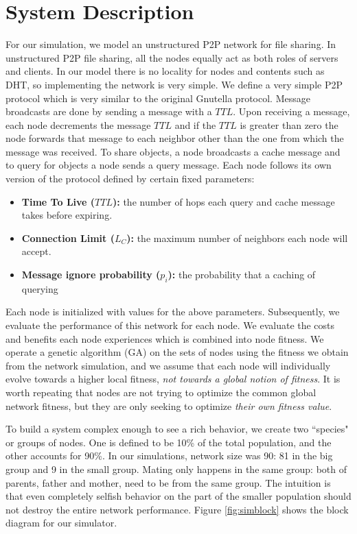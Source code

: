 \documentclass[12pt,journal,draftcls,letterpaper,onecolumn]{IEEEtran}
\begin{document}
\section{System Description}\label{sec:system}

For our simulation, we model an unstructured P2P network for file
sharing\cite{journals/comsur/LuaCPSL05}. In unstructured P2P file sharing, all the nodes
equally act as both roles of servers and clients.  In our model there is no
locality for nodes and contents such as DHT, so implementing the network is
very simple.  We define a very simple P2P protocol which is very similar to
the original Gnutella protocol.  Message broadcasts are done by sending a
message with a $TTL$.  Upon receiving a message, each node decrements the
message $TTL$ and if the $TTL$ is greater than zero the node forwards that message
to each neighbor other than the one from which the message was received.  To
share objects, a node broadcasts a cache message and to query for objects a
node sends a query message.  Each node follows its own version of the protocol
defined by certain fixed parameters:

\begin{itemize}
\item {\bf Time To Live ($TTL$):} the number of hops each query and cache message takes
before expiring.
\item {\bf Connection Limit ($L_C$):}
the maximum number of neighbors each node will accept.
\item {\bf Message ignore probability ($p_i$):}
the probability that a caching of querying 
\end{itemize}

Each node is initialized with values for the above parameters.  Subsequently,
we evaluate the performance of this network for each node.  We evaluate the
costs and benefits each node experiences which is combined into node fitness.
We operate a genetic algorithm (GA)\cite{genetic} on the sets of nodes using
the fitness we obtain from the network simulation, and we assume that each
node will individually evolve towards a higher local fitness, \emph{not
towards a global notion of fitness}.  It is worth repeating that nodes are not
trying to optimize the common global network fitness, but they are only
seeking to optimize \emph{their own fitness value}.

To build a system complex enough to see a rich behavior, we create two
``species" or groups of nodes.  One is defined to be 10\% of the total
population, and the other accounts for 90\%.  In our simulations, network size
was 90: 81 in the big group and 9 in the small group.
Mating only happens in the same group: both of parents, father and mother,
need to be from the same group.  The intuition is that even
completely selfish behavior on the part of the smaller population should not
destroy the entire network performance.
Figure \ref{fig:simblock} shows the block diagram for our simulator.
\end{document}
